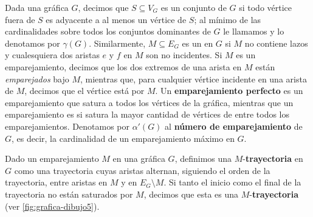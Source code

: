 Dada una gr\'afica $G$, decimos que $S\subseteq V_G$ es un conjunto
 de $G$ si todo v\'ertice fuera de $S$ es adyacente a al menos
un v\'ertice de $S$; al m\'inimo de las cardinalidades sobre todos los conjuntos
dominantes de $G$ le llamamos  y lo denotamos por
$\gamma(G)$. Similarmente, $M\subseteq E_G$ es un  en $G$
si $M$ no contiene lazos y cualesquiera dos aristas $e$ y $f$ en $M$ son no
incidentes. Si $M$ es un emparejamiento, decimos que los dos extremos de una
arista en $M$ est\'an \textit{emparejados} bajo $M$, mientras que, para
cualquier v\'ertice incidente en una arista de $M$, decimos que el v\'ertice
est\'a  por $M$. Un \textbf{emparejamiento
perfecto} es un emparejamiento que satura a todos
los v\'ertices de la gr\'afica, mientras que un emparejamiento es
 si satura la mayor cantidad de v\'ertices
de entre todos los emparejamientos. Denotamos por $\alpha'(G)$ al
\textbf{n\'umero de emparejamiento} de $G$, es
decir, la cardinalidad de un emparejamiento m\'aximo en $G$.

Dado un emparejamiento $M$ en una gr\'afica $G$, definimos una
$M$-\textbf{trayectoria}  en $G$ como una
trayectoria cuyas aristas alternan, siguiendo el orden de la trayectoria, entre
aristas en $M$ y en $E_G\setminus M$. Si tanto el inicio como el final de la
trayectoria no est\'an saturados por $M$, decimos que esta es una
$M$-\textbf{trayectoria}  (ver
\cref{fig:grafica-dibujo5}).

